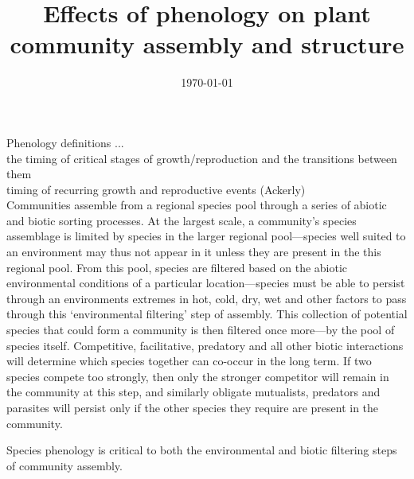 \documentclass[11pt]{article}
\begin{document}


\title{Effects of phenology on plant community assembly and structure }
\author{}
\date{\today}
\maketitle
\tableofcontents

Phenology definitions ...\\
the timing of critical stages of growth/reproduction and the transitions between them\\
timing of recurring growth and reproductive events (Ackerly)\\


Communities assemble from a regional species pool through a series of abiotic and biotic sorting processes. At the largest scale, a community's species assemblage is limited by species in the larger regional pool---species well suited to an environment may thus not appear in it unless they are present in the this regional pool. From this pool, species are filtered based on the abiotic environmental conditions of a particular location---species must be able to persist through an environments extremes in hot, cold, dry, wet and other factors to pass through this `environmental filtering' step of assembly. This collection of potential species that could form a community is then filtered once more---by the pool of species itself. Competitive, facilitative, predatory and all other biotic interactions will determine which species together can co-occur in the long term. If two species compete too strongly, then only the stronger competitor will remain in the community at this step, and similarly obligate mutualists, predators and parasites will persist only if the other species they require are present in the community. %

Species phenology is critical to both the environmental and biotic filtering steps of community assembly. %

\section*{}



\end{document}
